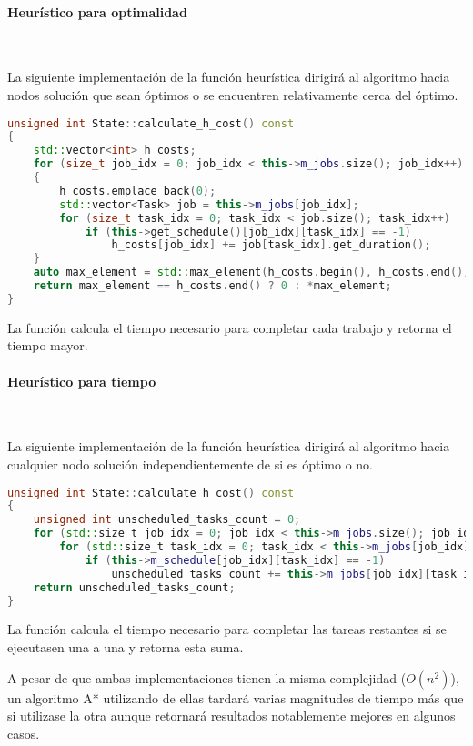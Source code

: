 \paragraph{Heurístico para optimalidad}~

La siguiente implementación de la función heurística
dirigirá al algoritmo hacia nodos solución que sean óptimos
o se encuentren relativamente cerca del óptimo.

\begin{lstlisting}[language=C++]
unsigned int State::calculate_h_cost() const
{
    std::vector<int> h_costs;
    for (size_t job_idx = 0; job_idx < this->m_jobs.size(); job_idx++)
    {
        h_costs.emplace_back(0);
        std::vector<Task> job = this->m_jobs[job_idx];
        for (size_t task_idx = 0; task_idx < job.size(); task_idx++)
            if (this->get_schedule()[job_idx][task_idx] == -1)
                h_costs[job_idx] += job[task_idx].get_duration();
    }
    auto max_element = std::max_element(h_costs.begin(), h_costs.end());
    return max_element == h_costs.end() ? 0 : *max_element;
}
\end{lstlisting}

La función calcula el tiempo necesario para completar cada trabajo
y retorna el tiempo mayor.

\paragraph{Heurístico para tiempo}~

La siguiente implementación de la función heurística
dirigirá al algoritmo hacia cualquier nodo solución
independientemente de si es óptimo o no.

\begin{lstlisting}[language=C++]
unsigned int State::calculate_h_cost() const
{
    unsigned int unscheduled_tasks_count = 0;
    for (std::size_t job_idx = 0; job_idx < this->m_jobs.size(); job_idx++)
        for (std::size_t task_idx = 0; task_idx < this->m_jobs[job_idx].size(); task_idx++)
            if (this->m_schedule[job_idx][task_idx] == -1)
                unscheduled_tasks_count += this->m_jobs[job_idx][task_idx].get_duration();
    return unscheduled_tasks_count; 
}
\end{lstlisting}

La función calcula el tiempo necesario para completar
las tareas restantes si se ejecutasen una a una
y retorna esta suma.

\begin{notebox}
    A pesar de que ambas implementaciones tienen la misma complejidad ($O(n^2)$),
    un algoritmo A* utilizando de ellas tardará varias magnitudes de tiempo más que
    si utilizase la otra aunque retornará resultados notablemente mejores en algunos casos.
\end{notebox}

